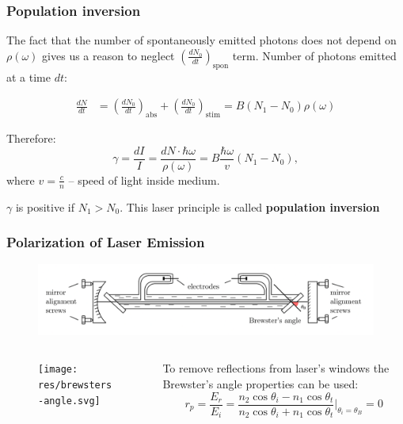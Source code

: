 \documentclass{beamer}
\begin{document}
	\begin{frame}
		\frametitle{Population inversion}
		The fact that the number of spontaneously emitted photons does not depend on  $\rho(\omega)$ gives us a reason to neglect $\left(\frac{dN_0}{dt}\right)_{\text{spon}}$ term. Number of photons emitted at a time $dt$:
		
		\begin{equation} \label{eq1}
			\begin{split}
				\frac{dN}{dt} & = \left(\frac{dN_0}{dt}\right)_{\text{abs}} + \left(\frac{dN_0}{dt}\right)_{\text{stim}} =  B (N_1 - N_0) \rho(\omega)
			\end{split}
		\end{equation}

		Therefore:
		\begin{equation}
			\gamma = \frac{dI}{I} = \frac{dN \cdot \hbar\omega}{\rho(\omega)} = B\frac{\hbar\omega }{v} (N_1 - N_0), 
		\end{equation}
		where $v = \frac{c}{n}$ -- speed of light inside medium.
		
		\vspace*{20px}
		\centering
		$\gamma$ is positive if $N_1 > N_0$. This laser principle is called \textbf{population inversion}
	\end{frame}



\begin{frame}
	\frametitle{Polarization of Laser Emission}
	\begin{figure}
		\centering
		\includegraphics[width=1\linewidth]{res/brewster_setup.pdf}
	\end{figure}
	
	\begin{columns}
		\begin{column}{0.3\textwidth}
			\begin{figure}
				\centering
				\texttt{[image: res/brewsters-angle.svg]}
			\end{figure}
		\end{column}
		\begin{column}{0.7\textwidth}
			To remove reflections from laser's windows the Brewster's angle properties can be used:
			$$r_p = \frac{E_r}{E_i} = \frac{n_2 \cos{\theta_i} - n_1 \cos{\theta_t}}{n_2 \cos{\theta_i} + n_1 \cos{\theta_t}}\bigg\rvert_{\theta_i = \theta_B} = 0$$
		\end{column}
	\end{columns}	
\end{frame}
\end{document}
